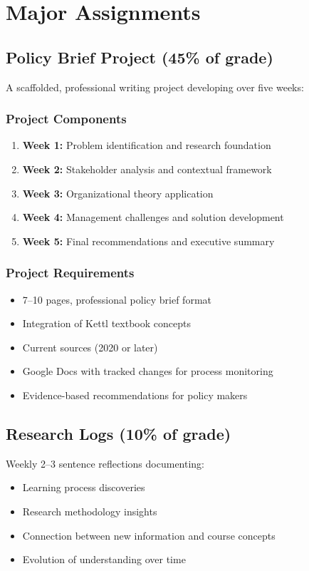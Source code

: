 \documentclass[11pt]{scrartcl} %
\begin{document}
\section{Major Assignments}

\subsection{Policy Brief Project (45\% of grade)}
A scaffolded, professional writing project developing over five weeks:

\subsubsection{Project Components}
\begin{enumerate}
\item \textbf{Week 1:} Problem identification and research foundation
\item \textbf{Week 2:} Stakeholder analysis and contextual framework
\item \textbf{Week 3:} Organizational theory application
\item \textbf{Week 4:} Management challenges and solution development
\item \textbf{Week 5:} Final recommendations and executive summary
\end{enumerate}

\subsubsection{Project Requirements}
\begin{itemize}
\item 7--10 pages, professional policy brief format
\item Integration of Kettl textbook concepts
\item Current sources (2020 or later)
\item Google Docs with tracked changes for process monitoring
\item Evidence-based recommendations for policy makers
\end{itemize}

\subsection{Research Logs (10\% of grade)}
Weekly 2--3 sentence reflections documenting:
\begin{itemize}
\item Learning process discoveries
\item Research methodology insights
\item Connection between new information and course concepts
\item Evolution of understanding over time
\end{itemize}
\end{document}
